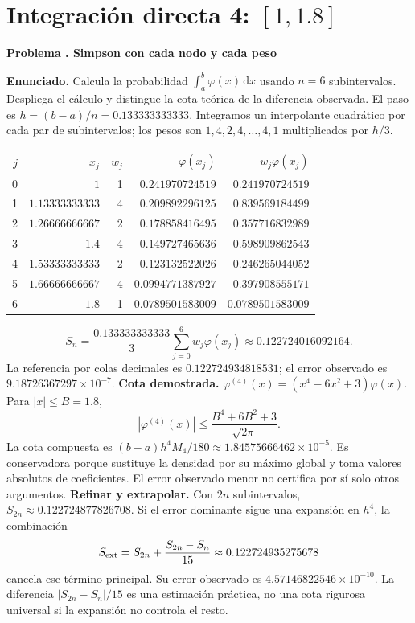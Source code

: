 \documentclass[11pt,a4paper]{article}
\newcommand{\dd}{\,\mathrm d}
\theoremstyle{definition}
\newcounter{problema}
\newenvironment{resuelto}[1]{\refstepcounter{problema}\par\medskip\Needspace{6\baselineskip}\textbf{Problema \theproblema. #1}\par}{\par\medskip}
\begin{document}
\section{\texorpdfstring{Integración directa 4: $[1,1.8]$}{Integración directa 4: [1,1.8]}}
\begin{resuelto}{Simpson con cada nodo y cada peso}
\textbf{Enunciado.} Calcula la probabilidad $\int_a^b\varphi(x)\dd x$ usando $n=6$ subintervalos. Despliega el cálculo y distingue la cota teórica de la diferencia observada.
El paso es $h=(b-a)/n=0.133333333333$. Integramos un interpolante cuadrático por cada par de subintervalos; los pesos son $1,4,2,4,\ldots,4,1$ multiplicados por $h/3$.

\begin{center}\small\begin{tabular}{rrrrr}
\toprule
$j$&$x_j$&$w_j$&$\varphi(x_j)$&$w_j\varphi(x_j)$\\
\midrule
0&$1$&1&$0.241970724519$&$0.241970724519$\\
1&$1.13333333333$&4&$0.209892296125$&$0.839569184499$\\
2&$1.26666666667$&2&$0.178858416495$&$0.357716832989$\\
3&$1.4$&4&$0.149727465636$&$0.598909862543$\\
4&$1.53333333333$&2&$0.123132522026$&$0.246265044052$\\
5&$1.66666666667$&4&$0.0994771387927$&$0.397908555171$\\
6&$1.8$&1&$0.0789501583009$&$0.0789501583009$\\
\bottomrule\end{tabular}\end{center}
\[
S_n=\frac{0.133333333333}{3}\sum_{j=0}^{6}w_j\varphi(x_j)\approx0.122724016092164.
\]
La referencia por colas decimales es $0.122724934818531$; el error observado es $9.18726367297\times10^{-7}$.
\textbf{Cota demostrada.} $\varphi^{(4)}(x)=(x^4-6x^2+3)\varphi(x)$. Para $|x|\le B=1.8$,
\[
|\varphi^{(4)}(x)|\le\frac{B^4+6B^2+3}{\sqrt{2\pi}}.
\]
La cota compuesta es $(b-a)h^4M_4/180\approx1.84575666462\times10^{-5}$. Es conservadora porque sustituye la densidad por su máximo global y toma valores absolutos de coeficientes. El error observado menor no certifica por sí solo otros argumentos.
\textbf{Refinar y extrapolar.} Con $2n$ subintervalos, $S_{2n}\approx0.122724877826708$. Si el error dominante sigue una expansión en $h^4$, la combinación
\[
S_{\rm ext}=S_{2n}+\frac{S_{2n}-S_n}{15}\approx0.122724935275678
\]
cancela ese término principal. Su error observado es $4.57146822546\times10^{-10}$. La diferencia $|S_{2n}-S_n|/15$ es una estimación práctica, no una cota rigurosa universal si la expansión no controla el resto.
\end{resuelto}
\end{document}

